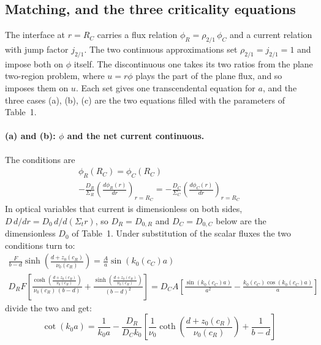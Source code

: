 \documentclass[11pt]{article}
\begin{document}
\subsection*{Matching, and the three criticality equations}
The interface at $r = R_C$ carries a flux relation $\phi_R = \rho_{2/1}\,\phi_C$ and a current relation with jump factor $j_{2/1}$. The two continuous approximations set $\rho_{2/1} = j_{2/1} = 1$ and impose both on $\phi$ itself. The discontinuous one takes its two ratios from the plane two-region problem, where $u = r\phi$ plays the part of the plane flux, and so imposes them on $u$. Each set gives one transcendental equation for $a$, and the three cases (a), (b), (c) are the two equations filled with the parameters of Table~1.

\paragraph{(a) and (b): $\phi$ and the net current continuous.} The conditions are
\begin{gather}
    \phi_R(R_C) = \phi_C(R_C) \\
    -\frac{D_R}{\Sigma_R}\left(\frac{d\phi_R(r)}{dr}\right)_{r=R_C} = -\frac{D_C}{\Sigma_C}\left(\frac{d\phi_C(r)}{dr}\right)_{r=R_C}
\end{gather}
In optical variables that current is dimensionless on both sides, $D\,d/dr = D_0\,d/d(\Sigma_t r)$, so $D_R=D_{0,R}$ and $D_C=D_{0,C}$ below are the dimensionless $D_0$ of Table~1. Under substitution of the scalar fluxes the two conditions turn to:
\begin{gather}
    \frac{F}{b-d}\sinh\!\left(\frac{d + z_0(c_R)}{\nu_0(c_R)}\right) = \frac{A}{a}\sin\!\left(k_0(c_C)a\right) \\
    D_R F\left[\frac{\cosh\!\left(\frac{d + z_0(c_R)}{\nu_0(c_R)}\right)}{\nu_0(c_R)\,(b-d)} + \frac{\sinh\!\left(\frac{d + z_0(c_R)}{\nu_0(c_R)}\right)}{(b-d)^2}\right]
    = D_C A\left[\frac{\sin\!\left(k_0(c_C)a\right)}{a^2} - \frac{k_0(c_C)\cos\!\left(k_0(c_C)a\right)}{a}\right]
\end{gather}
divide the two and get:
\begin{equation}
    \boxed{\;\cot\!(k_0a) = \frac{1}{k_0a} - \frac{D_R}{D_C k_0}\left[\frac{1}{\nu_0}\coth\!\left(\frac{d + z_0(c_R)}{\nu_0(c_R)}\right) + \frac{1}{b-d}\right]\;}
    \label{eq:reflcrit}
\end{equation}
\end{document}
